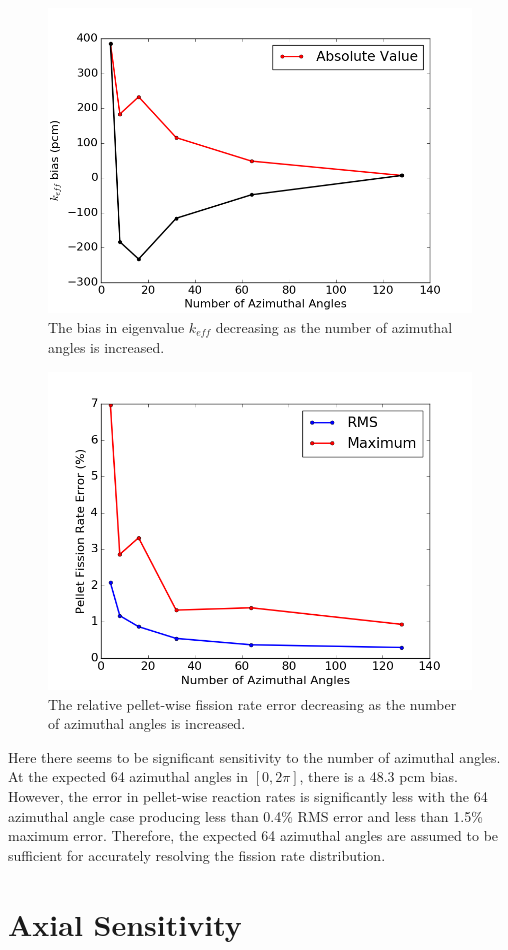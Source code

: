 \begin{figure}[h!]
	\centering
	\includegraphics[width=0.7\linewidth]{figures/results/sensitivity/az_angles_pcm.png}
	\caption[]{The bias in eigenvalue $k_{\textit{eff}}$ decreasing as the number of azimuthal angles is increased.}
	\label{fig:az-angles-pcm}
\end{figure}
\begin{figure}[h!]
	\centering
	\includegraphics[width=0.7\linewidth]{figures/results/sensitivity/az_angles_fr.png}
	\caption[]{The relative pellet-wise fission rate error decreasing as the number of azimuthal angles is increased.}
	\label{fig:az-angles-fr}
\end{figure}

Here there seems to be significant sensitivity to the number of azimuthal angles. At the expected 64 azimuthal angles in $[0, 2\pi]$, there is a 48.3 pcm bias. However, the error in pellet-wise reaction rates is significantly less with the 64 azimuthal angle case producing less than 0.4\% \ac{RMS} error and less than 1.5\% maximum error. Therefore, the expected 64 azimuthal angles are assumed to be sufficient for accurately resolving the fission rate distribution. 


\section{Axial Sensitivity}
\label{sec:axial-sensitivity}

